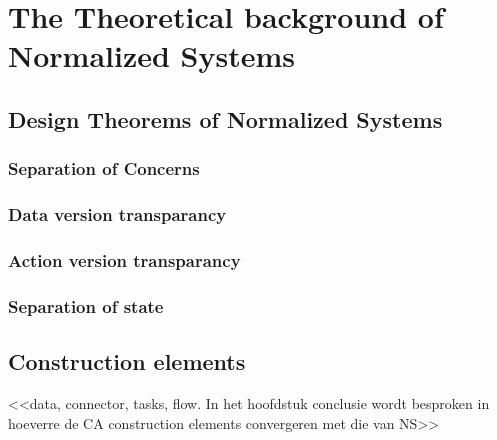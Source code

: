 \section{The Theoretical background of Normalized Systems} \label{ns_theory}

\subsection{Design Theorems of Normalized Systems} \label{subsec:ns_desing_theorems}


\subsubsection{Separation of Concerns}


\subsubsection{Data version transparancy}


\subsubsection{Action version transparancy}


\subsubsection{Separation of state}

\subsection{Construction elements}
<<data, connector, tasks, flow. In het hoofdstuk conclusie wordt
besproken in hoeverre de CA construction elements convergeren met die van NS>>
